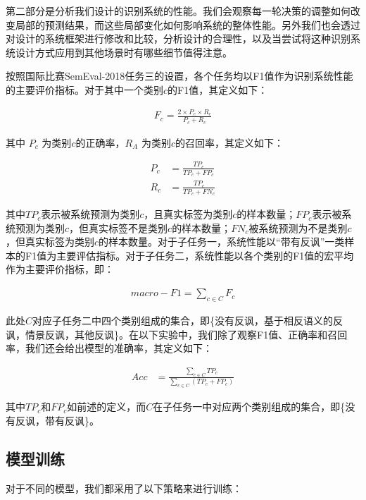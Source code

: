 第二部分是分析我们设计的识别系统的性能。我们会观察每一轮决策的调整如何改变局部的预测结果，而这些局部变化如何影响系统的整体性能。另外我们也会透过对设计的系统框架进行修改和比较，分析设计的合理性，以及当尝试将这种识别系统设计方式应用到其他场景时有哪些细节值得注意。

按照国际比赛SemEval-2018任务三的设置，各个任务均以F1值作为识别系统性能的主要评价指标。对于其中一个类别$c$的F1值，其定义如下：

\begin{align}
  F_c = \frac{2 \times P_c \times R_c}{P_c + R_c} 
\end{align}

其中 $P_c$ 为类别$c$的正确率，$R_A$ 为类别$c$的召回率，其定义如下：

\begin{align}
  P_c &= \frac{TP_c}{TP_c + FP_c} \\
  R_c &= \frac{TP_c}{TP_c + FN_c}
\end{align} 

其中$TP_c$表示被系统预测为类别$c$，且真实标签为类别$c$的样本数量；$FP_c$表示被系统预测为类别$c$，但真实标签不是类别$c$的样本数量；$FN_c$被系统预测为不是类别$c$，但真实标签为类别$c$的样本数量。对于子任务一，系统性能以“带有反讽”一类样本的F1值为主要评估指标。对于子任务二，系统性能以各个类别的F1值的宏平均作为主要评价指标，即：

\begin{align}
  macro-F1 = \sum\limits_{c \in C}F_c
\end{align}

此处$C$对应子任务二中四个类别组成的集合，即\{没有反讽，基于相反语义的反讽，情景反讽，其他反讽\}。在以下实验中，我们除了观察F1值、正确率和召回率，我们还会给出模型的准确率，其定义如下：

\begin{align}
  Acc &= \frac{\sum\limits_{c \in C} TP_c}{\sum\limits_{c \in C}(TP_c + FP_c)}
\end{align}

其中$TP_c$和$FP_c$如前述的定义，而$C$在子任务一中对应两个类别组成的集合，即\{没有反讽，带有反讽\}。

\subsection{模型训练}

对于不同的模型，我们都采用了以下策略来进行训练：

